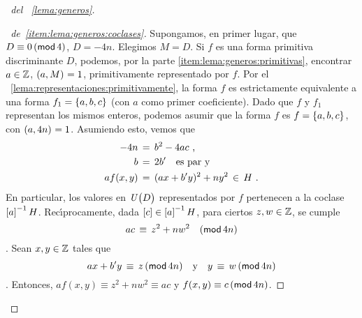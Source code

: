\begin{proof}[\proofname~del \lemaname~\ref{lema:generos}]
	\begin{proof}[\proofname~de~\ref{item:lema:generos:coclases}]
		Supongamos, en primer lugar, que $D\equiv 0\tmodulo[4]$,
		$D=-4n$. Elegimos $M=D$. Si $f$ es una forma
		primitiva discriminante $D$, podemos, por la parte
		\ref{item:lema:generos:primitivas}, encontrar $a\in\Enteros$,
		$\mcd{a,M}=1$, primitivamente representado por $f$.
		Por el \lemaname~\ref{lema:representaciones:primitivamente},
		la forma $f$ es estrictamente equivalente a una forma
		$f_1=\binaria{a,b,c}$ (con $a$ como primer coeficiente).
		Dado que $f$ y $f_1$ representan los mismos enteros,
		podemos asumir que la forma $f$ es $f=\binaria{a,b,c}$,
		con $\mcd{a,4n}=1$. Asumiendo esto, vemos que
		\begin{displaymath}
			\begin{aligned}
				-4n & \,=\,b^2-4ac \dispcomma \\
				b & \,=\,2b' \quad\text{es par y} \\
				af(x,y) & \,=\,(ax+b'y)^2+ny^2
				\,\in\,H
				\dispstop
			\end{aligned}
		\end{displaymath}
		En particular, los valores en $\Unidadesmod[D]$ representados
		por $f$ pertenecen a la coclase $\clase a^{-1}H$.
		Rec\'{\i}procamente, dada $\clase c\in\clase a^{-1}H$,
		para ciertos $z,w\in\Enteros$, se cumple
		\begin{displaymath}
			ac\,\equiv\,z^2+nw^2\modulo[4n]
		\end{displaymath}
		\quedacomoejercicio.
		Sean $x,y\in\Enteros$ tales que
		\begin{displaymath}
			ax+b'y\,\equiv\,z\tmodulo[4n]
			\dispand
			y\,\equiv\,w\tmodulo[4n]
		\end{displaymath}
		\quedacomoejercicio.
		Entonces, $af(x,y)\equiv z^2+nw^2\equiv ac$ y
		$f(x,y)\equiv c\tmodulo[4n]$.


\end{proof}
\end{proof}
